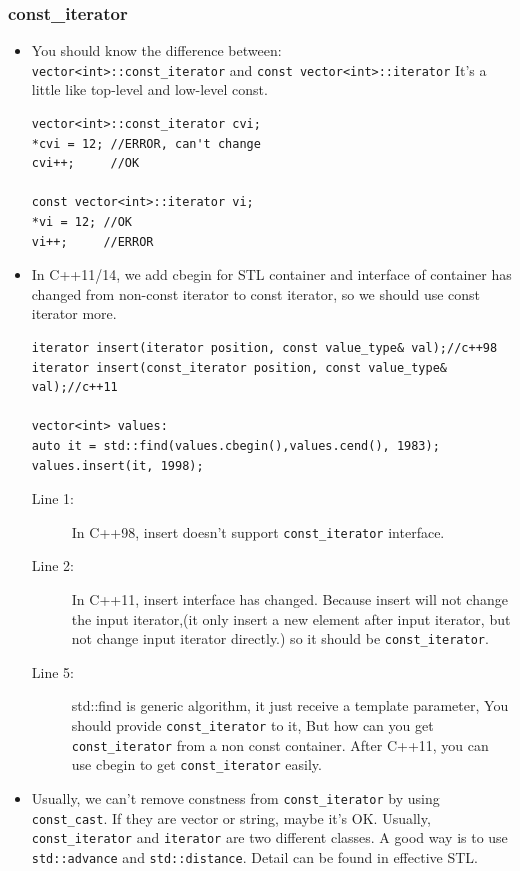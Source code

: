 \documentclass[a4paper,11pt,twoside]{book}
\begin{document}
\subsubsection{const\_iterator}
\begin{itemize}
	\item You should know the difference between: \\
	\texttt{vector<int>::const\_iterator} and \texttt{const vector<int>::iterator}
	It's a little like top-level and low-level const. 
\begin{lstlisting}[numbers=none]
vector<int>::const_iterator cvi;
*cvi = 12; //ERROR, can't change
cvi++;     //OK
	
const vector<int>::iterator vi;
*vi = 12; //OK
vi++;     //ERROR
\end{lstlisting}
	
	\item In C++11/14, we add cbegin for STL container and interface of container has changed from non-const iterator to const iterator, so we should use const iterator more. 
\begin{lstlisting}
iterator insert(iterator position, const value_type& val);//c++98
iterator insert(const_iterator position, const value_type& val);//c++11
	
vector<int> values:
auto it = std::find(values.cbegin(),values.cend(), 1983);
values.insert(it, 1998);
\end{lstlisting}
\begin{description}
	\item[Line 1:] In C++98, insert doesn't support \texttt{const\_iterator} interface.
	
	\item[Line 2:] In C++11, insert interface has changed. Because insert will not change the input iterator,(it only insert a new element after input iterator, but not change input iterator directly.) so it should be \texttt{const\_iterator}.
	
	\item[Line 5:] std::find is generic algorithm, it just receive a template parameter,  You should provide \texttt{const\_iterator} to it, But how can you get \texttt{const\_iterator} from a non const container. After C++11, you can use cbegin to get \texttt{const\_iterator} easily.
\end{description}

	\item Usually, we can't remove constness from \texttt{const\_iterator} by using \texttt{const\_cast}. If they are vector or string, maybe it's OK. Usually, \texttt{const\_iterator} and \texttt{iterator} are two different classes. A good way is to use \texttt{std::advance} and \texttt{std::distance}. Detail can be found in effective STL. 
	

\end{itemize}
\end{document}
